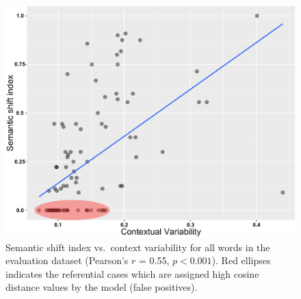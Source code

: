 \begin{figure}[t]\centering
\includegraphics[width=\columnwidth]{images/contextual_variability_shift_index_annotated_2.png}
\caption{Semantic shift index vs.~context variability for all words in the evaluation dataset (Pearson's $r$ = 0.55, $p< 0.001$). Red ellipses indicates the referential cases which are assigned high cosine distance values by the model (false positives).
\label{fig:shift-variability}}
\end{figure}


%






